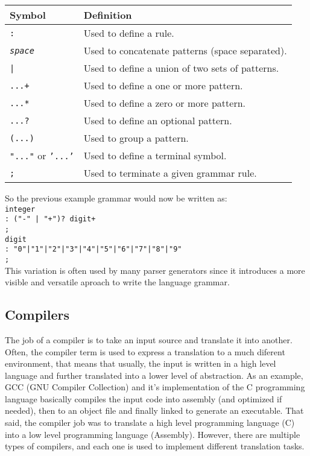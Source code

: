 \begin{center}
    \begin{tabular}{ | l | p{10cm} |}
    \hline
    \textbf{Symbol} & \textbf{Definition} \\ \hline
    \texttt{:} & Used to define a rule. \\ \hline
    \texttt{\textit{space}} & Used to concatenate patterns (space separated). \\ \hline
    \texttt{|} & Used to define a union of two sets of patterns. \\ \hline
    \texttt{...+} & Used to define a one or more pattern. \\ \hline
    \texttt{...*} & Used to define a zero or more pattern. \\ \hline
    \texttt{...?} & Used to define an optional pattern. \\ \hline
    \texttt{(...)} & Used to group a pattern. \\ \hline
    \texttt{"..."} or \texttt{'...'} & Used to define a terminal symbol. \\ \hline
    \texttt{;} & Used to terminate a given grammar rule. \\ \hline
    \end{tabular}
\end{center}

\noindent
So the previous example grammar would now be written as:\\

\noindent
\texttt{integer\\\tab: ("-" | "+")? digit+\\\tab;}\\
\texttt{digit\\\tab: "0"|"1"|"2"|"3"|"4"|"5"|"6"|"7"|"8"|"9"\\\tab;}\\

\noindent
This variation is often used by many parser generators since it introduces a more visible and versatile aproach to
write the language grammar.

\subsection{Compilers}

The job of a compiler is to take an input source and translate it into another. Often, the compiler term is used to express
a translation to a much diferent environment, that means that usually, the input is written in a high level language and further
translated into a lower level of abstraction. As an example, GCC (GNU Compiler Collection) and it's implementation of the C programming
language basically compiles the input code into assembly (and optimized if needed), then to an object file and finally linked
to generate an executable. That said, the compiler job was to translate a high level programming language (C) into a low level programming
language (Assembly). However, there are multiple types of compilers, and each one is used to implement different translation tasks.

